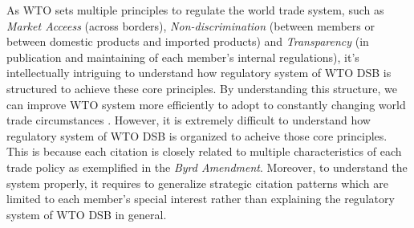 As WTO sets multiple principles to regulate the world trade system, 
such as \textit{Market Acceess} (across borders), 
\textit{Non-discrimination} (between members 
or between domestic products and imported products) 
and \textit{Transparency} (in publication and maintaining 
of each member's internal regulations), 
it's intellectually intriguing 
to understand how regulatory system of WTO DSB
is structured to achieve these core principles.
By understanding this structure, 
we can improve WTO system more efficiently 
to adopt to constantly 
changing world trade circumstances
\citep{FREDEBEULKREIN1999625, shaffer_2004, 10.1093/jiel/jgm028}.
However, it is extremely difficult to 
understand how regulatory system of 
WTO DSB is organized to acheive 
those core principles. 
This is because each citation is closely related 
to multiple characteristics 
of each trade policy as exemplified in 
the \textit{Byrd Amendment}. 
Moreover, to understand the system properly, 
it requires to generalize strategic 
citation patterns which are limited 
to each member's special interest 
rather than explaining the 
regulatory system of WTO DSB in general.


